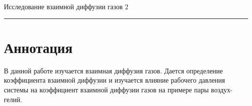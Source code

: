 \documentclass[12pt,a4paper]{scrartcl}
\begin{document}
	
	\begin{flushleft}
		\footnotesize{Исследование взаимной диффузии газов} \hspace{\fill} \footnotesize{2}
		\\[-0.3cm]\noindent\rule{\textwidth}{0.3pt}
	\end{flushleft}
	
	\section{Аннотация}
	
	В данной работе изучается взаимная диффузия газов. Дается определение коэффициента взаимной диффузии и изучается влияние рабочего давления системы на коэффициент взаимной диффузии газов на примере пары воздух-гелий.
	
\end{document}
